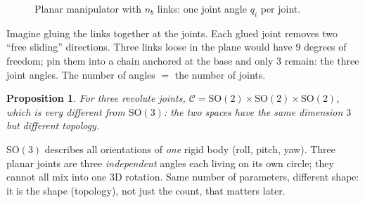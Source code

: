\documentclass[11pt,a4paper]{article}
\newcommand{\C}{\mathcal{C}}
\newcommand{\SO}{\mathrm{SO}}
\theoremstyle{definition}
\theoremstyle{plain}
\newtheorem{proposition}[definition]{Proposition}
\theoremstyle{remark}
\begin{document}
\begin{figure}[ht]
\centering
{}
\caption{Planar manipulator with $n_b$ links: one joint angle $q_i$ per joint.}
\end{figure}

\begin{intuition}
Imagine gluing the links together at the joints. Each glued joint removes two ``free sliding'' directions. Three links loose in the plane would have $9$ degrees of freedom; pin them into a chain anchored at the base and only $3$ remain: the three joint angles. The number of angles $=$ the number of joints.
\end{intuition}

\begin{proposition}\label{prop:so2-not-so3}
For three revolute joints, $\C=\SO(2)\times\SO(2)\times\SO(2)$, which is very different from $\SO(3)$: the two spaces have the same dimension $3$ but different topology.
\end{proposition}

\begin{intuition}
$\SO(3)$ describes all orientations of \emph{one} rigid body (roll, pitch, yaw). Three planar joints are three \emph{independent} angles each living on its own circle; they cannot all mix into one 3D rotation. Same number of parameters, different shape: it is the shape (topology), not just the count, that matters later.
\end{intuition}
\end{document}
